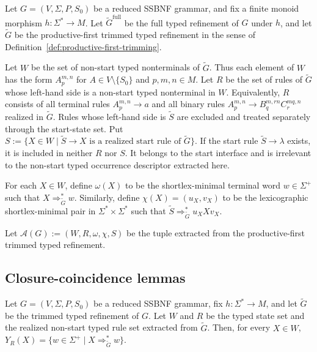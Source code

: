 \documentclass[sub]{jalc}
\newcommand{\Gfull}{\widetilde G^{\mathrm{full}}}
\newcommand{\Gtrim}{\widetilde G}
\begin{document}
Let \(G=(V,\Sigma,P,S_0)\) be a reduced SSBNF grammar, and fix a finite monoid morphism \(h:\Sigma^*\to M\). Let \(\Gfull\) be the full typed refinement of \(G\) under \(h\), and let \(\Gtrim\) be the productive-first trimmed typed refinement in the sense of Definition~\ref{def:productive-first-trimming}.

Let \(W\) be the set of non-start typed nonterminals of \(\Gtrim\). Thus each element of \(W\) has the form \(A_p^{m,n}\) for \(A\in V\setminus\{S_0\}\) and \(p,m,n\in M\). Let \(R\) be the set of rules of \(\Gtrim\) whose left-hand side is a non-start typed nonterminal in \(W\). Equivalently, \(R\) consists of all terminal rules \(A_p^{m,n}\to a\) and all binary rules \(A_p^{m,n}\to B_q^{m,rn}C_r^{mq,n}\) realized in \(\Gtrim\). Rules whose left-hand side is \(\widetilde S\) are excluded and treated separately through the start-state set. Put \(S:=\{X\in W\mid \widetilde S\to X\text{ is a realized start rule of }\Gtrim\}\). If the start rule \(\widetilde S\to\lambda\) exists, it is included in neither \(R\) nor \(S\). It belongs to the start interface and is irrelevant to the non-start typed occurrence descriptor extracted here.

For each \(X\in W\), define \(\omega(X)\) to be the shortlex-minimal terminal word \(w\in\Sigma^+\) such that \(X\Rightarrow_{\Gtrim}^* w\). Similarly, define \(\chi(X)=(u_X,v_X)\) to be the lexicographic shortlex-minimal pair in \(\Sigma^*\times\Sigma^*\) such that \(\widetilde S\Rightarrow_{\Gtrim}^* u_X X v_X\).

Let \(\mathcal A(G):=(W,R,\omega,\chi,S)\) be the tuple extracted from the productive-first trimmed typed refinement.

\subsection{Closure-coincidence lemmas}
\label{subsec:auxiliary-lemmas}

\begin{lemma}
\label{lem:yield-closure-coincidence}
Let \(G=(V,\Sigma,P,S_0)\) be a reduced SSBNF grammar, fix \(h:\Sigma^*\to M\), and let \(\Gtrim\) be the trimmed typed refinement of \(G\). Let \(W\) and \(R\) be the typed state set and the realized non-start typed rule set extracted from \(\Gtrim\). Then, for every \(X\in W\), \(Y_R(X)=\{w\in\Sigma^+\mid X\Rightarrow_{\Gtrim}^* w\}\).
\end{lemma}
\end{document}
